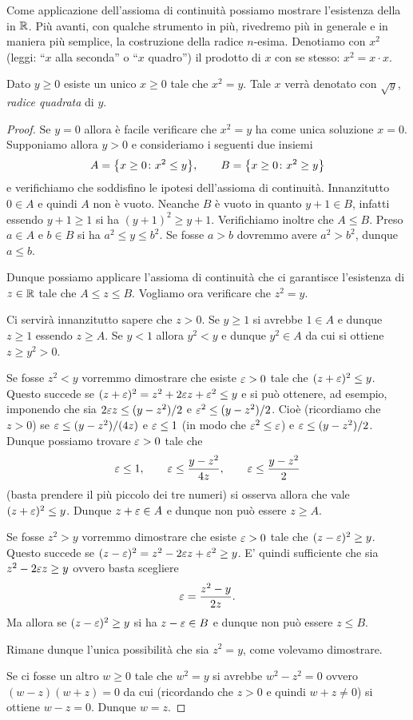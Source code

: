 Come applicazione dell'assioma di continuità possiamo mostrare l'esistenza
della  in $\mathbb R$.
Più avanti, con qualche strumento in più, rivedremo più in generale
e in maniera più semplice, la costruzione della radice $n$-esima.
Denotiamo con $x^2$ (leggi: ``$x$ alla seconda'' o ``$x$ quadro'') il prodotto di $x$ con se stesso: $x^2 = x\cdot x$.

\begin{theorem}
\label{th:radice_quadrata}
\mymark{***}
Dato $y\ge 0$ esiste un unico $x\ge 0$ tale che $x^2=y$.
Tale $x$ verrà denotato con $\sqrt y$, \emph{radice quadrata} di $y$.
\mymargin{$\sqrt{\cdot}$}
\end{theorem}
\begin{proof}
\mymark{*}
Se $y=0$ allora è facile verificare che $x^2=y$ ha come unica soluzione $x=0$.
Supponiamo allora $y>0$ e
consideriamo i seguenti due insiemi
\[
  A = {\left\{ x\ge 0 \colon x^2 \le y \right\}},\qquad
  B = {\left\{ x\ge 0 \colon x^2 \ge y \right\}}
\]
e verifichiamo che soddisfino le ipotesi dell'assioma di continuità.
Innanzitutto $0\in A$ e quindi $A$ non è vuoto.
Neanche $B$ è vuoto in quanto $y+1\in B$,
infatti essendo $y+1\ge 1$ si ha
$(y+1)^2 \ge y+1$. Verifichiamo inoltre che $A \le B$.
Preso $a\in A$ e $b\in B$ si ha $a^2 \le y \le b^2$.
Se fosse $a>b$ dovremmo avere $a^2>b^2$, dunque $a \le b$.

Dunque possiamo applicare l'assioma di continuità
che ci garantisce l'esistenza di $z\in \mathbb R$ tale che $A \le z \le B$.
Vogliamo ora verificare che $z^2 = y$.

Ci servirà innanzitutto sapere che $z>0$. Se $y\ge 1$ si avrebbe $1\in A$
e dunque $z\ge 1$ essendo $z\ge A$. Se $y<1$ allora $y^2 < y$ e dunque $y^2 \in A$
da cui si ottiene $z\ge y^2 > 0$.

Se fosse $z^2 < y$ vorremmo dimostrare che esiste $\varepsilon>0$ tale che
$(z+\varepsilon)^2 \le y$.
Questo succede se $(z+\varepsilon)^2 = z^2 + 2 \varepsilon z + \varepsilon^2 \le y$
e si può ottenere, ad esempio,
imponendo che sia $2\varepsilon z \le (y-z^2)/2$ e $\varepsilon^2 \le (y-z^2)/2$.
Cioè (ricordiamo che $z>0$) se $\varepsilon \le (y-z^2)/(4z)$ e $\varepsilon \le 1$
(in modo che $\varepsilon^2 \le \varepsilon$)
e $\varepsilon \le (y-z^2)/2$. Dunque possiamo
trovare $\varepsilon>0$
tale che
\[
\varepsilon \le 1, \qquad
\varepsilon \le \frac{y-z^2}{4z}, \qquad
\varepsilon \le \frac{y-z^2}2
\]
(basta prendere il più piccolo dei tre numeri)
si osserva allora
che vale $(z+\varepsilon)^2\le y$.
Dunque $z+\varepsilon \in A$ e dunque non può essere $z\ge A$.

Se fosse $z^2 > y$ vorremmo dimostrare che esiste $\varepsilon>0$ tale che
$(z-\varepsilon)^2 \ge y$.
Questo succede se $(z-\varepsilon)^2 = z^2 - 2\varepsilon z + \varepsilon^2 \ge y$.
E' quindi sufficiente che sia $z^2 - 2 \varepsilon z \ge y$ ovvero basta scegliere
\[
  \varepsilon = \frac{z^2-y}{2z}.
\]
Ma allora se $(z-\varepsilon)^2\ge y$ si ha $z-\varepsilon \in B$ e dunque non può
essere $z \le B$.

Rimane dunque l'unica possibilità che sia $z^2 = y$, come volevamo dimostrare.

Se ci fosse un altro $w\ge 0$ tale che $w^2 = y$ si avrebbe $w^2 - z^2=0$ ovvero
$(w-z)(w+z)=0$ da cui (ricordando che $z>0$ e quindi $w+z\neq 0$)
si ottiene $w-z=0$. Dunque $w=z$.
\end{proof}

